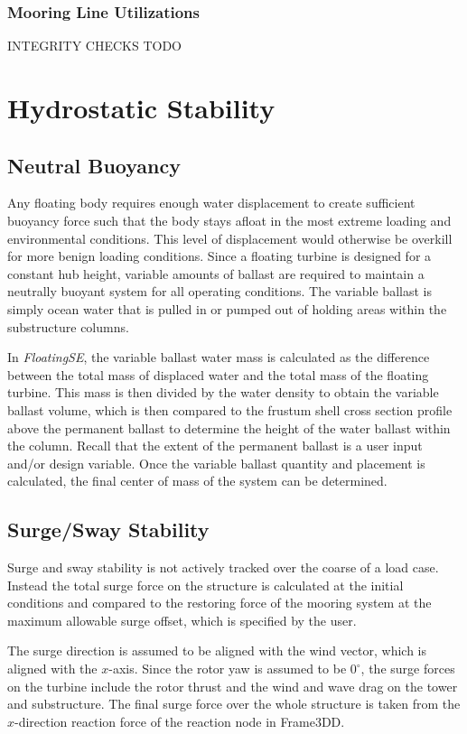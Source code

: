\subsubsection{Mooring Line Utilizations}
INTEGRITY CHECKS TODO


\section{Hydrostatic Stability}
\label{sec:static}
\subsection{Neutral Buoyancy}
Any floating body requires enough water displacement to create
sufficient buoyancy force such that the body stays afloat in the most
extreme loading and environmental conditions.  This level of
displacement would otherwise be overkill for more benign loading
conditions.  Since a floating turbine is designed for a constant hub
height, variable amounts of ballast are required to maintain a neutrally
buoyant system for all operating conditions.  The variable ballast is
simply ocean water that is pulled in or pumped out of holding areas
within the substructure columns.

In \textit{FloatingSE}, the variable ballast water mass is calculated as
the difference between the total mass of displaced water and the total
mass of the floating turbine.  This mass is then divided by the water
density to obtain the variable ballast volume, which is then compared to
the frustum shell cross section profile above the permanent ballast to
determine the height of the water ballast within the column.  Recall
that the extent of the permanent ballast is a user input and/or design
variable.  Once the variable ballast quantity and placement is
calculated, the final center of mass of the system can be determined.

\subsection{Surge/Sway Stability}
Surge and sway stability is not actively tracked over the coarse of a
load case.  Instead the total surge force on the structure is calculated
at the initial conditions and compared to the restoring force of the
mooring system at the maximum allowable surge offset, which is specified
by the user.

The surge direction is assumed to be aligned with the wind vector, which
is aligned with the $x$-axis.  Since the rotor yaw is assumed to be
$0^{\circ}$, the surge forces on the turbine include the rotor thrust
and the wind and wave drag on the tower and substructure.  The final
surge force over the whole structure is taken from the $x$-direction
reaction force of the reaction node in Frame3DD.

